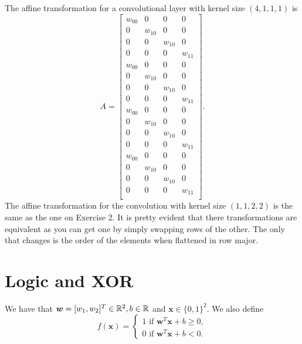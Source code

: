 \documentclass[twoside]{article}
\begin{document}
The affine transformation for a convolutional layer with kernel size
$(4, 1, 1, 1)$ is 
\begin{equation*}
    A =
    \begin{bmatrix}
        w_{00} &0&0&0\\ 
        0&w_{10}&0&0\\ 
        0&0& w_{10}&0\\ 
        0&0&0&w_{11}\\
        w_{00} &0&0&0\\ 
        0&w_{10}&0&0\\ 
        0&0& w_{10}&0\\ 
        0&0&0&w_{11}\\
        w_{00} &0&0&0\\ 
        0&w_{10}&0&0\\ 
        0&0& w_{10}&0\\ 
        0&0&0&w_{11}\\
        w_{00} &0&0&0\\ 
        0&w_{10}&0&0\\ 
        0&0& w_{10}&0\\ 
        0&0&0&w_{11}\\
    \end{bmatrix}.
\end{equation*}
The affine transformation for the convolution with kernel size $(1, 1, 2, 2)$
is the same as the one on Exercise 2. It is pretty evident that there 
transformations are equivalent as you can get one by simply swapping rows 
of the other. The only that changes is the order of the elements when 
flattened in row major.

\section{Logic and XOR}
We have that $\bm{w} = [w_{1}, w_{2}]^{T} \in \mathbb{R}^{2}, b \in \mathbb{R}$ and $\bm{x} \in \{0,1\}^{2}$. We also define
\begin{equation*}
	f(\bm{x}) =
	\begin{cases}
		1 \text{ if } \bm{w}^{T}\bm{x} + b \geq 0,\\
		0  \text{ if } \bm{w}^{T}\bm{x} + b < 0.
	\end{cases}
\end{equation*}
\end{document}
